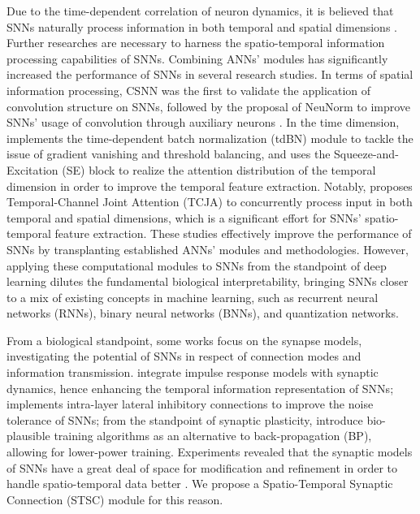 \documentclass[letterpaper]{article} \usepackage[submission]{aaai23}  \usepackage{times}  \usepackage{helvet}  \usepackage{courier}  \usepackage[hyphens]{url}  \usepackage{graphicx} \urlstyle{rm} \def\UrlFont{\rm}  \usepackage{natbib}  \usepackage{caption} \frenchspacing  \setlength{\pdfpagewidth}{8.5in} \setlength{\pdfpageheight}{11in} \usepackage{algorithm}
\begin{document}
Due to the time-dependent correlation of neuron dynamics, it is believed that SNNs naturally process information in both temporal and spatial dimensions \cite{roy_towards_2019}. Further researches are necessary to harness the spatio-temporal information processing capabilities of SNNs. Combining ANNs’ modules has significantly increased the performance of SNNs in several research studies. In terms of spatial information processing, CSNN \cite{xu_csnn_2018} was the first to validate the application of convolution structure on SNNs, followed by the proposal of NeuNorm to improve SNNs’ usage of convolution through auxiliary neurons \cite{wu_direct_2019}. In the time dimension, \cite{zheng_going_2020} implements the time-dependent batch normalization (tdBN) module to tackle the issue of gradient vanishing and threshold balancing, and \cite{yao_temporal-wise_2021} uses the Squeeze-and-Excitation (SE) block \cite{hu_squeeze-and-excitation_2018} to realize the attention distribution of the temporal dimension in order to improve the temporal feature extraction. Notably, \cite{zhu_tcja-snn_2022} proposes Temporal-Channel Joint Attention (TCJA) to concurrently process input in both temporal and spatial dimensions, which is a significant effort for SNNs' spatio-temporal feature extraction. These studies effectively improve the performance of SNNs by transplanting established ANNs' modules and methodologies. However, applying these computational modules to SNNs from the standpoint of deep learning dilutes the fundamental biological interpretability, bringing SNNs closer to a mix of existing concepts in machine learning, such as recurrent neural networks (RNNs), binary neural networks (BNNs), and quantization networks. 


From a biological standpoint, some works focus on the synapse models, investigating the potential of SNNs in respect of connection modes and information transmission. \cite{shrestha_slayer_2018,fang_exploiting_2020,yu_map-snn_2022} integrate impulse response models with synaptic dynamics, hence enhancing the temporal information representation of SNNs; \cite{cheng_lisnn_2020} implements intra-layer lateral inhibitory connections to improve the noise tolerance of SNNs; from the standpoint of synaptic plasticity, \cite{bellec_solution_2020,zhang_spike-train_2019} introduce bio-plausible training algorithms as an alternative to back-propagation (BP), allowing for lower-power training. Experiments revealed that the synaptic models of SNNs have a great deal of space for modification and refinement in order to handle spatio-temporal data better \cite{fang_exploiting_2020}. We propose a Spatio-Temporal Synaptic Connection (STSC) module for this reason.
\end{document}
